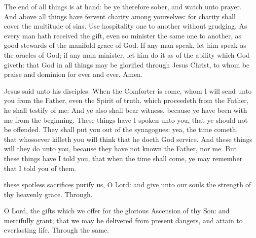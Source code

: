  The end of all things is at hand: be ye therefore sober, and watch unto prayer. And above all things have fervent charity among yourselves: for charity shall cover the multitude of sins. Use hospitality one to another without grudging. As every man hath received the gift, even so minister the same one to another, as good stewards of the manifold grace of God. If any man speak, let him speak as the oracles of God; if any man minister, let him do it as of the ability which God giveth: that God in all things may be glorified through Jesus Christ, to whom be praise and dominion for ever and ever. Amen.


 Jesus said unto his disciples: When the Comforter is come, whom I will send unto you from the Father, even the Spirit of truth, which proceedeth from the Father, he shall testify of me: And ye also shall bear witness, because ye have been with me from the beginning. These things have I spoken unto you, that ye should not be offended. They shall put you out of the synagogues: yea, the time cometh, that whosoever killeth you will think that he doeth God service. And these things will they do unto you, because they have not known the Father, nor me. But these things have I told you, that when the time shall come, ye may remember that I told you of them.

\secret
{} these spotless sacrifices purify us, O Lord: and give unto our souls the strength of thy heavenly grace. Through.\\
\par{}
 O Lord, the gifts which we offer for the glorious Ascension of thy Son: and mercifully grant; that we may be delivered from present dangers, and attain to everlasting life. Through the same.

